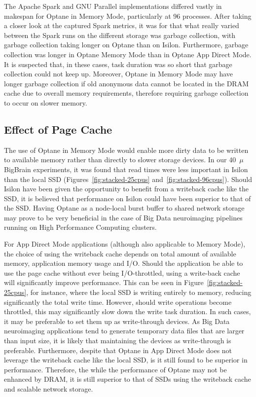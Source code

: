 \documentclass[conference]{IEEEtran}
\newcommand{\bigbrain}{BigBrain\xspace}
\begin{document}
The Apache Spark and GNU Parallel implementations differed vastly in makespan 
for Optane in Memory Mode, particularly at 96 processes. After taking a closer look at
the captured Spark metrics, it was for that what really varied between the Spark runs on
the different storage was garbage collection, with garbage collection taking longer on Optane 
than on Isilon. Furthermore, garbage collection was longer in Optane Memory Mode than in 
Optane App Direct Mode. It is suspected that, in these cases, task duration was so short
that garbage collection could not keep up. Moreover, Optane in Memory Mode may have longer
garbage collection if old anonymous data cannot be located in the DRAM cache due to overall memory 
requirements, therefore requiring garbage collection to occur on slower memory.

\subsection{Effect of Page Cache}

The use of Optane in Memory Mode would enable more dirty data to be written to available memory
rather than directly to slower storage devices. In our 40~$\mu$ \bigbrain experiments, it was found
that read times were less important in Isilon than the local SSD (Figures~\ref{fig:stacked-25cpus}
and~\ref{fig:stacked-96cpus}). Should Isilon have been given the opportunity to benefit from a 
writeback cache like the SSD, it is believed that performance on Isilon could have been superior 
to that of the SSD. Having Optane as a node-local burst buffer to shared network storage 
may prove to be very beneficial in the case of Big Data neuroimaging pipelines running on
High Performance Computing clusters.

For App Direct Mode applications (although also applicable to Memory Mode), the 
choice of using the writeback cache depends on total amount of available memory, application
memory usage and I/O. Should the application be able to use the page cache without ever being
I/O-throttled, using a write-back cache will significantly improve performance. This can 
be seen in Figure~\ref{fig:stacked-25cpus}, for instance, where the local SSD is writing
entirely to memory, reducing significantly the total write time. However, should write operations
become throttled, this may significantly slow down the write task duration. In such cases,
it may be preferable to set them up as write-through devices. As Big Data neuroimaging applications
tend to generate temporary data files that are larger than input size, it is likely that maintaining the
devices as write-through is preferable. Furthermore, despite that Optane in App Direct Mode does
not leverage the writeback cache like the local SSD, is it still found to be superior in performance.
Therefore, the while the performance of Optane may not be enhanced by DRAM, it is still superior to that of
SSDs using the writeback cache and scalable network storage.
\end{document}
